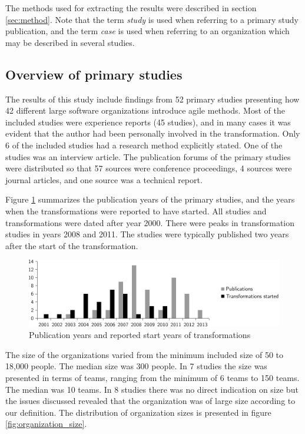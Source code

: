 \documentclass[preprint,authoryear,12pt]{elsarticle}
\begin{document}
The methods used for extracting the results were described in section
\ref{sec:method}. Note that the term \emph{study} is used when referring to a
primary study publication, and the term \emph{case} is used when referring to an
organization which may be described in several studies.

\subsection{Overview of primary studies}

The results of this study include findings from 52 primary studies presenting
how 42 different large software organizations introduce agile methods. Most of
the included studies were experience reports (45 studies), and in many cases it
was evident that the author had been personally involved in the transformation.
Only 6 of the included studies had a research method explicitly stated. One of
the studies was an interview article. The publication forums of the primary
studies were distributed so that 57 sources were conference proceedings, 4
sources were journal articles, and one source was a technical report.

Figure \ref{fig:transformation_time} summarizes the publication years of the
primary studies, and the years when the transformations were reported to have
started. All studies and transformations were dated after year 2000. There were
peaks in transformation studies in years 2008 and 2011. The studies were
typically published two years after the start of the transformation.

\begin{figure}[b]
  \begin{center}
    \includegraphics[width=1\textwidth]{graphics/transformation_time.pdf}
    \caption{Publication years and reported start years of transformations}
    \label{fig:transformation_time}
  \end{center}
\end{figure}

The size of the organizations varied from the minimum included size of 50 to
18,000 people. The median size was 300 people. In 7 studies the size was
presented in terms of teams, ranging from the minimum of 6 teams to 150 teams.
The median was 10 teams. In 8 studies there was no direct indication on size
but the issues discussed revealed that the organization was of large size
according to our definition. The distribution of organization sizes is presented
in figure \ref{fig:organization_size}.
\end{document}
